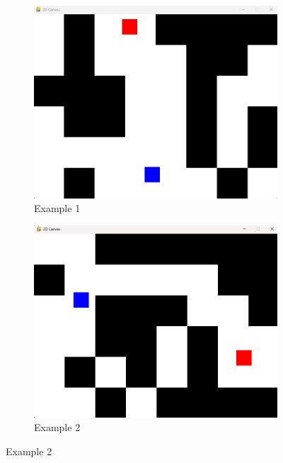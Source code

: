 \begin{figure}[htbp]
  \centering
  \begin{subfigure}{0.45\textwidth}
      \centering
      \includegraphics[width=0.6\linewidth]{assets/early-work/obs-gen1.png}
      \caption{Example 1}
  \end{subfigure}%
  \hfill
  \begin{subfigure}{0.45\textwidth}
      \centering
      \includegraphics[width=0.6\linewidth]{assets/early-work/obs-gen2.png}
      \caption{Example 2}
  \end{subfigure}

  \vspace{0.5cm}


\end{figure}

